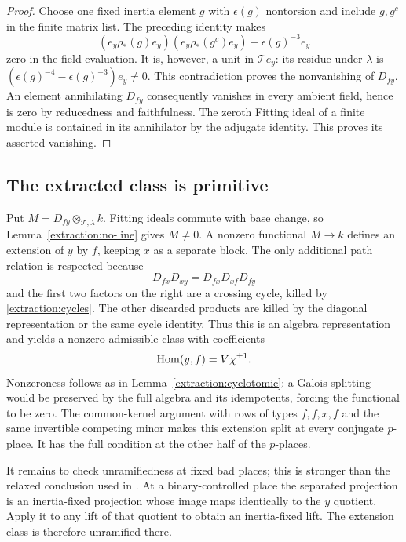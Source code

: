 \begin{proof}
Choose one fixed inertia element $g$ with $\epsilon(g)$
nontorsion and include $g,g^c$ in the finite matrix list.
The preceding identity makes
\[
 (e_y\rho_*(g)e_y)(e_y\rho_*(g^c)e_y)
                           -\epsilon(g)^{-3}e_y
\]
zero in the field evaluation.  It is, however, a unit in
$\mathscr T e_y$: its residue under $\lambda$ is
$(\epsilon(g)^{-4}-\epsilon(g)^{-3})e_y\ne0$.
This contradiction proves the nonvanishing of $D_{fy}$.
An element annihilating $D_{fy}$ consequently vanishes in
every ambient field, hence is zero by reducedness and
faithfulness.  The zeroth Fitting ideal of a finite module
is contained in its annihilator by the adjugate identity.
This proves its asserted vanishing.
\end{proof}

\subsection{The extracted class is primitive}

Put $M=D_{fy}\otimes_{\mathscr T,\lambda}k$.  Fitting ideals
commute with base change, so Lemma~\ref{extraction:no-line}
gives $M\ne0$.  A nonzero functional $M\to k$ defines an
extension of $y$ by $f$, keeping $x$ as a separate block.
The only additional path relation is respected because
\[
 D_{fx}D_{xy}=D_{fx}D_{xf}D_{fy}
\]
and the first two factors on the right are a crossing
cycle, killed by \eqref{extraction:cycles}.  The other
discarded products are killed by the diagonal
representation or the same cycle identity.  Thus this is
an algebra representation and yields a nonzero admissible
class with coefficients
\[
                     \operatorname{Hom}(y,f)=V\chi^{\pm1}.
\]
Nonzeroness follows as in Lemma~\ref{extraction:cyclotomic}:
a Galois splitting would be preserved by the full algebra
and its idempotents, forcing the functional to be zero.
The common-kernel argument with rows of types $f,f,x,f$
and the same invertible competing minor makes this
extension split at every conjugate $p$-place.  It has the
full condition at the other half of the $p$-places.

It remains to check unramifiedness at fixed bad places;
this is stronger than the relaxed conclusion used in
\cite[Proposition~9.7]{C}.  At a binary-controlled
place the separated projection is an inertia-fixed
projection whose image maps identically to the $y$
quotient.  Apply it to any lift of that quotient to obtain
an inertia-fixed lift.  The extension class is therefore
unramified there.

